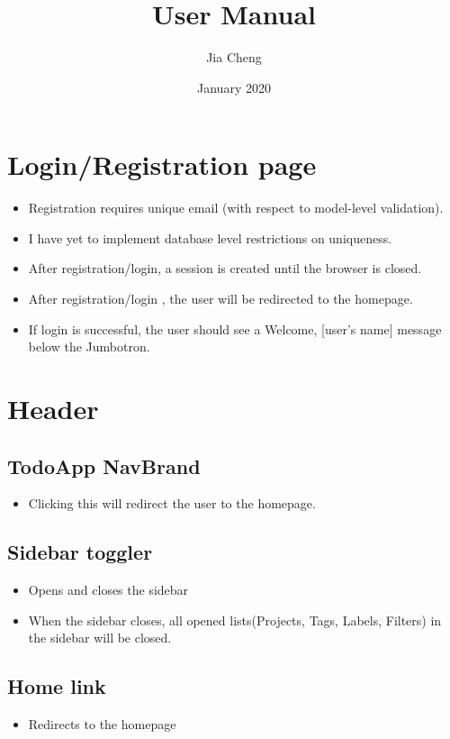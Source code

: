 \documentclass{article}
\title{User Manual}
\author{Jia Cheng}
\date{January 2020}
\begin{document}
\maketitle

\section{Login/Registration page}
\begin{itemize}
  \item Registration requires unique email (with respect to model-level validation).
  \item I have yet to implement database level restrictions on uniqueness.
  \item After registration/login, a session is created until the browser is closed.
  \item After registration/login , the user will be redirected to the homepage.
  \item If login is successful, the user should see a Welcome, [user’s name] message below the Jumbotron.
\end{itemize}


\section{Header}

\subsection{TodoApp NavBrand}
\begin{itemize}
  \item Clicking this will redirect the user to the homepage.
\end{itemize}


\subsection{Sidebar toggler}
\begin{itemize}
  \item Opens and closes the sidebar
  \item When the sidebar closes, all opened lists(Projects, Tags, Labels, Filters) in the sidebar will be closed.
\end{itemize}


\subsection{Home link}
\begin{itemize}
  \item Redirects to the homepage
\end{itemize}
\end{document}
